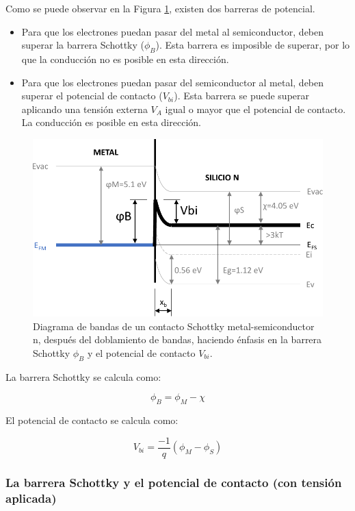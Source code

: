 Como se puede observar en la Figura \ref{schottky1d}, existen dos barreras de potencial. 

\begin{itemize}
    \item Para que los electrones puedan pasar del metal al semiconductor, deben superar la barrera Schottky ($\phi_B$). Esta barrera es imposible de superar, por lo que la conducción no es posible en esta dirección.
    \item Para que los electrones puedan pasar del semiconductor al metal, deben superar el potencial de contacto ($V_{bi}$). Esta barrera se puede superar aplicando una tensión externa $V_A$ igual o mayor que el potencial de contacto. La conducción es posible en esta dirección.
\end{itemize}

\begin{figure}[H]
    \centering
    \includegraphics{figuras/contacto_schottky_4.pdf}
    \caption{Diagrama de bandas de un contacto Schottky metal-semiconductor n, después del doblamiento de bandas, haciendo énfasis en la barrera Schottky $\phi_B$ y el potencial de contacto $V_{bi}$.}
    \label{schottky1d}
\end{figure}

La barrera Schottky se calcula como:

\[ \phi_B = \phi_M - \chi \]

El potencial de contacto se calcula como:

\[ V_{bi} = \dfrac{-1}{q} (\phi_M - \phi_S) \]


\newpage
\subsubsection{La barrera Schottky y el potencial de contacto (con tensión aplicada)}

